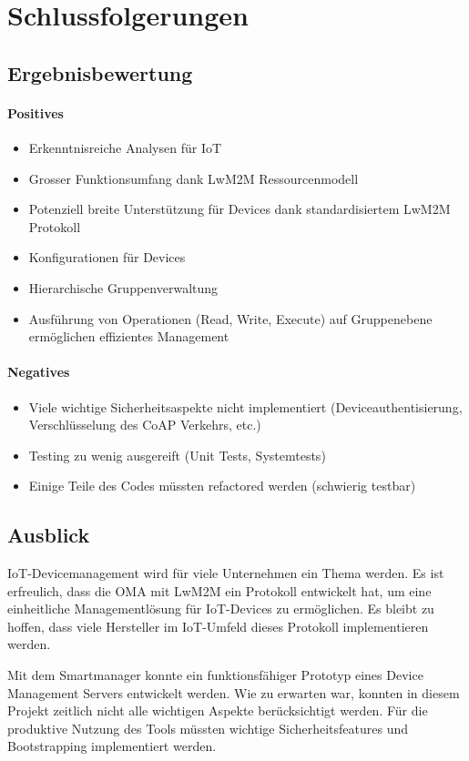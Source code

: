 \chapter{Schlussfolgerungen}
\section{Ergebnisbewertung}
\subsubsection{Positives}
\begin{itemize}
\item Erkenntnisreiche Analysen für IoT
\item Grosser Funktionsumfang dank LwM2M Ressourcenmodell
\item Potenziell breite Unterstützung für Devices dank standardisiertem LwM2M Protokoll
\item Konfigurationen für Devices
\item Hierarchische Gruppenverwaltung
\item Ausführung von Operationen (Read, Write, Execute) auf Gruppenebene ermöglichen effizientes Management
\end{itemize}

\subsubsection{Negatives}
\begin{itemize}
\item Viele wichtige Sicherheitsaspekte nicht implementiert (Deviceauthentisierung, Verschlüsselung des CoAP Verkehrs, etc.)
\item Testing zu wenig ausgereift (Unit Tests, Systemtests)
\item Einige Teile des Codes müssten refactored werden (schwierig testbar)
\end{itemize}

\section{Ausblick}
IoT-Devicemanagement wird für viele Unternehmen ein Thema werden. Es ist erfreulich, dass die OMA mit LwM2M ein Protokoll entwickelt hat, um eine einheitliche Managementlösung für IoT-Devices zu ermöglichen. Es bleibt zu hoffen, dass viele Hersteller im IoT-Umfeld dieses Protokoll implementieren werden.

Mit dem Smartmanager konnte ein funktionsfähiger Prototyp eines Device Management Servers entwickelt werden. Wie zu erwarten war, konnten in diesem Projekt zeitlich nicht alle wichtigen Aspekte berücksichtigt werden. Für die produktive Nutzung des Tools müssten wichtige Sicherheitsfeatures und Bootstrapping implementiert werden.

